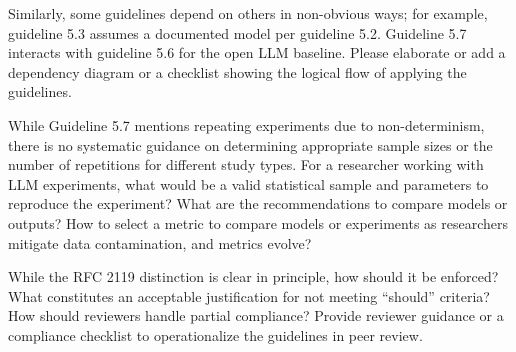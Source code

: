 \documentclass[12pt,english]{reviewresponse}
\begin{document}
\begin{revcomment}
Similarly, some guidelines depend on others in non-obvious ways; for example, guideline 5.3 assumes a documented model per guideline 5.2. Guideline 5.7 interacts with guideline 5.6 for the open LLM baseline. Please elaborate or add a dependency diagram or a checklist showing the logical flow of applying the guidelines.
\end{revcomment}
\begin{revresponse}

\end{revresponse}

\begin{revcomment}
While Guideline 5.7 mentions repeating experiments due to non-determinism, there is no systematic guidance on determining appropriate sample sizes or the number of repetitions for different study types. For a researcher working with LLM experiments, what would be a valid statistical sample and parameters to reproduce the experiment? What are the recommendations to compare models or outputs? How to select a metric to compare models or experiments as researchers mitigate data contamination, and metrics evolve?
\end{revcomment}
\begin{revresponse}
\end{revresponse}

\begin{revcomment}
While the RFC 2119 distinction is clear in principle, how should it be enforced?  What constitutes an acceptable justification for not meeting ``should'' criteria? How should reviewers handle partial compliance? Provide reviewer guidance or a compliance checklist to operationalize the guidelines in peer review.
\end{revcomment}
\end{document}
